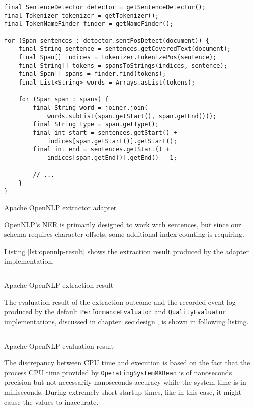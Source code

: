 \begin{listing}[H]
\begin{verbatim}
final SentenceDetector detector = getSentenceDetector();
final Tokenizer tokenizer = getTokenizer();
final TokenNameFinder finder = getNameFinder();

for (Span sentences : detector.sentPosDetect(document)) {
    final String sentence = sentences.getCoveredText(document);
    final Span[] indices = tokenizer.tokenizePos(sentence);
    final String[] tokens = spansToStrings(indices, sentence);
    final Span[] spans = finder.find(tokens);
    final List<String> words = Arrays.asList(tokens);

    for (Span span : spans) {
        final String word = joiner.join(
            words.subList(span.getStart(), span.getEnd()));
        final String type = span.getType();
        final int start = sentences.getStart() + 
            indices[span.getStart()].getStart();
        final int end = sentences.getStart() + 
            indices[span.getEnd()].getEnd() - 1;

        // ...
    }
}
\end{verbatim}
\caption{Apache OpenNLP extractor adapter}
\label{lst:opennlp-adapter}
\end{listing}

OpenNLP's \gls{NER} is primarily designed to work with sentences, but since our schema requires character offsets, some additional index counting is requiring.

\newpage
Listing \ref{lst:opennlp-result} shows the extraction result produced by the adapter implementation.

\begin{listing}[H]
\inputminted{xml}{opennlp.xml}
\caption{Apache OpenNLP extraction result}
\label{lst:opennlp-result}
\end{listing}

The evaluation result of the extraction outcome and the recorded event log produced by the default \texttt{PerformanceEvaluator} and \texttt{QualityEvaluator} implementations, discussed in chapter \ref{sec:design}, is shown in following listing.

\begin{listing}[H]
\inputminted{java}{opennlp.txt}
\caption{Apache OpenNLP evaluation result}
\label{lst:opennlp-eval-result}
\end{listing}

The discrepancy between CPU time and execution is based on the fact that the process CPU time provided by \texttt{OperatingSystemMXBean} is of nanoseconds precision but not necessarily nanoseconds accuracy\cite{OperatingSystemMXBean} while the system time is in milliseconds. During extremely short startup times, like in this case, it might cause the values to inaccurate.

